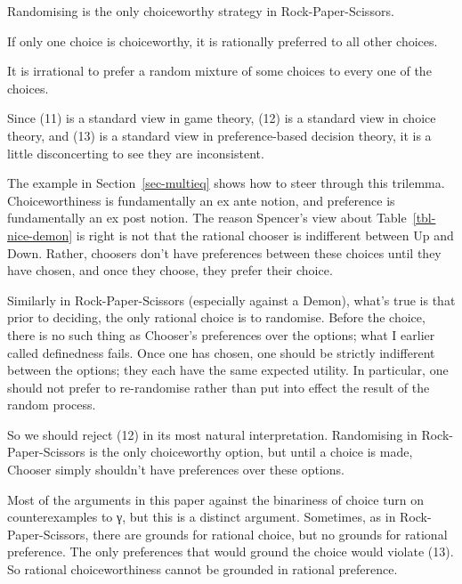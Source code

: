 \documentclass[
  10.5pt,
  twoside]{article}
\providecommand{\tightlist}{%
  \setlength{\itemsep}{0pt}\setlength{\parskip}{0pt}}
\let\oldenumerate\enumerate
\let\endoldenumerate\endenumerate
\renewenvironment{enumerate}
  {\vskip 5pt\oldenumerate}
  {\endoldenumerate\vskip 5pt}
\begin{document}
\begin{enumerate}
\def\labelenumi{(\arabic{enumi})}
\setcounter{enumi}{10}
\tightlist
\item
  Randomising is the only choiceworthy strategy in Rock-Paper-Scissors.
\item
  If only one choice is choiceworthy, it is rationally preferred to all
  other choices.
\item
  It is irrational to prefer a random mixture of some choices to every
  one of the choices.
\end{enumerate}

Since (11) is a standard view in game theory, (12) is a standard view in
choice theory, and (13) is a standard view in preference-based decision
theory, it is a little disconcerting to see they are inconsistent.

The example in Section~\ref{sec-multieq} shows how to steer through this
trilemma. Choiceworthiness is fundamentally an ex ante notion, and
preference is fundamentally an ex post notion. The reason Spencer's view
about Table~\ref{tbl-nice-demon} is right is not that the rational
chooser is indifferent between Up and Down. Rather, choosers don't have
preferences between these choices until they have chosen, and once they
choose, they prefer their choice.

Similarly in Rock-Paper-Scissors (especially against a Demon), what's
true is that prior to deciding, the only rational choice is to
randomise. Before the choice, there is no such thing as Chooser's
preferences over the options; what I earlier called definedness fails.
Once one has chosen, one should be strictly indifferent between the
options; they each have the same expected utility. In particular, one
should not prefer to re-randomise rather than put into effect the result
of the random process.

So we should reject (12) in its most natural interpretation. Randomising
in Rock-Paper-Scissors is the only choiceworthy option, but until a
choice is made, Chooser simply shouldn't have preferences over these
options.

Most of the arguments in this paper against the binariness of choice
turn on counterexamples to γ, but this is a distinct argument.
Sometimes, as in Rock-Paper-Scissors, there are grounds for rational
choice, but no grounds for rational preference. The only preferences
that would ground the choice would violate (13). So rational
choiceworthiness cannot be grounded in rational preference.
\end{document}
